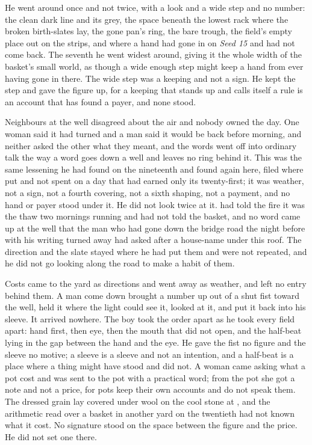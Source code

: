 He went around  once and not twice, with a look and a wide step and no number: the clean dark line and its grey, the space beneath the lowest rack where the broken birth-slates lay, the gone pan's ring, the bare trough, the field's empty place out on the strips, and  where a hand had gone in on \emph{Seed 15} and had not come back. The seventh he went widest around, giving it the whole width of the basket's small world, as though a wide enough step might keep a hand from ever having gone in there. The wide step was a keeping and not a sign. He kept the step and gave the figure up, for a keeping that stands up and calls itself a rule is an account that has found a payer, and none stood.

Neighbours at the well disagreed about the air and nobody owned the day. One woman said it had turned and a man said it would be back before morning, and neither asked the other what they meant, and the words went off into ordinary talk the way a word goes down a well and leaves no ring behind it. This was the same lessening he had found on the nineteenth and found again here, filed where put and not spent on a day that had earned only its twenty-first; it was weather, not a sign, not a fourth covering, not a sixth shaping, not a payment, and no hand or payer stood under it. He did not look twice at it.  had told the fire it was the thaw two mornings running and had not told the basket, and no word came up at the well that the man who had gone down the bridge road the night before with his writing turned away had asked after a house-name under this roof. The direction and the slate stayed where he had put them and were not repeated, and he did not go looking along the road to make a habit of them.

Costs came to the yard as directions and went away as weather, and left no entry behind them. A man come down  brought a number up out of a shut fist toward the well, held it where the light could see it, looked at it, and put it back into his sleeve. It arrived nowhere. The boy took the order apart as he took every field apart: hand first, then eye, then the mouth that did not open, and the half-beat lying in the gap between the hand and the eye. He gave the fist no figure and the sleeve no motive; a sleeve is a sleeve and not an intention, and a half-beat is a place where a thing might have stood and did not. A woman came asking what a pot cost and was sent to the pot with a practical word; from the pot she got a note and not a price, for pots keep their own accounts and do not speak them. The dressed grain lay covered under wool on the cool stone at , and the arithmetic read over a basket in another yard on the twentieth had not known what it cost. No signature stood on the space between the figure and the price. He did not set one there.

